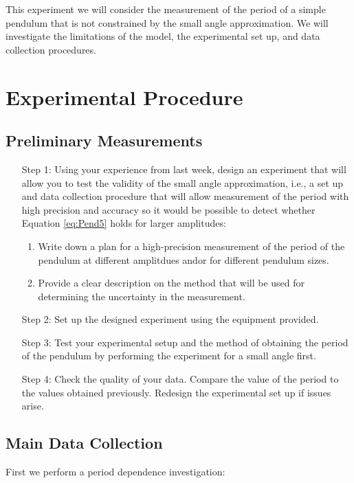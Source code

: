 This experiment we will consider the measurement of the period of a simple pendulum that is not constrained by the small angle approximation. We will investigate the limitations of the model, the experimental set up, and data collection procedures.


\section{Experimental Procedure}

\subsection{Preliminary Measurements}

\begin{itemize}[leftmargin = 50pt]
    \item[Step 1:] Using your experience from last week, design an experiment that will allow you to test the validity of the small angle approximation, i.e., a set up and data collection procedure that will allow measurement of the period with high precision and accuracy so it would be possible to detect whether Equation \ref{eq:Pend5} holds for larger amplitudes: \begin{enumerate}
            \item Write down a plan for a high-precision measurement of the period of the pendulum at different amplitdues andor for different pendulum sizes.
            \item Provide a clear description on the method that will be used for determining the uncertainty in the measurement.
    \end{enumerate}
    \item[Step 2:] Set up the designed experiment using the equipment provided.
    \item[Step 3:] Test your experimental setup and the method of obtaining the period of the pendulum by performing the experiment for a small angle first.
    \item[Step 4:] Check the quality of your data. Compare the value of the period to the values obtained previously. Redesign the experimental set up if issues arise.
\end{itemize}

\subsection{Main Data Collection}

First we perform a period dependence investigation:


